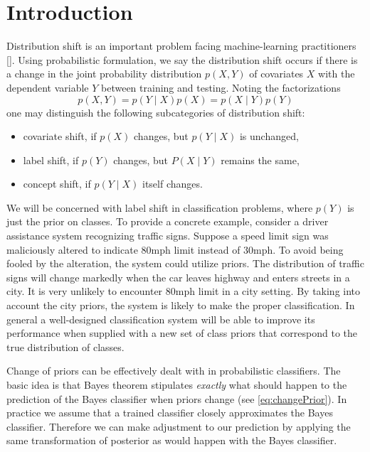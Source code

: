 \section{Introduction}



Distribution shift is an important problem facing machine-learning practitioners  [\cite{zhang2023dive, sugiyama2007covariate}].  Using probabilistic formulation, we say the distribution shift occurs if there is a change  in the joint probability distribution $p(X,Y)$ of covariates $X$ with the dependent variable $Y$  between training and testing. Noting the factorizations 
$$
p(X,Y) = p(Y\mid X)p(X) = p(X \mid Y )p(Y)
$$
one may distinguish the following subcategories of distribution shift:
\begin{itemize}
	\item covariate shift, if $p(X)$ changes, but $p(Y\mid X)$ is unchanged,
	\item label shift, if $p(Y)$ changes, but $P(X \mid Y)$ remains the same,
	\item concept shift, if $p(Y \mid X)$ itself changes.
\end{itemize}

We will be concerned with label shift in classification problems, where $p(Y)$ is just the prior on classes.   To provide a concrete example, consider a driver assistance system recognizing traffic signs. Suppose a speed limit sign was maliciously altered to indicate 80mph limit instead of 30mph. To avoid being fooled by the alteration, the system could utilize priors. The distribution of traffic signs will change markedly when the car leaves highway and enters streets in a city. It is very unlikely to encounter 80mph limit in a city setting. By taking into account the city priors, the system is likely to make the proper classification. In general a well-designed classification system will be able to improve its performance when supplied with a new set of class priors that correspond to the true distribution of classes. 

Change of priors can be effectively dealt with in probabilistic classifiers. The basic idea is that Bayes theorem stipulates \emph{exactly} what should happen  to the prediction of the  Bayes classifier when priors change (see \eqref{eq:changePrior}).  In practice we assume that a trained classifier closely approximates the Bayes classifier. Therefore we can make adjustment to our prediction by applying the same transformation of posterior as would happen with the Bayes classifier. 


